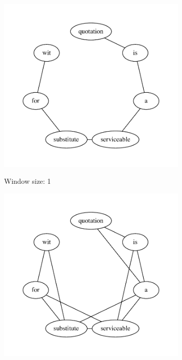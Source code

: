 \begin{figure}[htb!]%
    \centering
    \begin{subfigure}[t]{0.32\linewidth}{\includegraphics[width=\linewidth]{assets/figures/cooccurrence/window_size_1.pdf}}%
    \caption{Window size: 1}%
    \end{subfigure}
    \begin{subfigure}[t]{0.32\linewidth}{\includegraphics[width=\linewidth]{assets/figures/cooccurrence/window_size_2.pdf}}%

\end{subfigure}
\end{figure}

